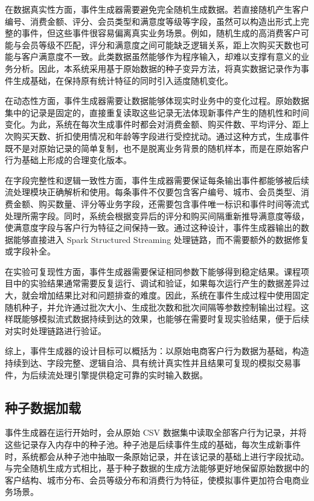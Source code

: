 \documentclass[12pt,hyperref,a4paper,UTF8]{ctexart}
\begin{document}
在数据真实性方面，事件生成器需要避免完全随机生成数据。若直接随机产生客户编号、消费金额、评分、会员类型和满意度等级等字段，虽然可以构造出形式上完整的事件，但这些事件很容易偏离真实业务场景。例如，随机生成的高消费客户可能与会员等级不匹配，评分和满意度之间可能缺乏逻辑关系，距上次购买天数也可能与客户满意度不一致。此类数据虽然能够作为程序输入，却难以支撑有意义的业务分析。因此，本系统采用基于原始数据的种子变异方法，将真实数据记录作为事件生成基础，在保持原有统计特征的同时引入适度随机变化。

在动态性方面，事件生成器需要让数据能够体现实时业务中的变化过程。原始数据集中的记录是固定的，直接重复读取这些记录无法体现新事件产生的随机性和时间变化。为此，系统在每次生成事件时都会对消费金额、购买件数、平均评分、距上次购买天数、折扣使用情况和年龄等字段进行受控扰动。通过这种方式，生成事件既不是对原始记录的简单复制，也不是脱离业务背景的随机样本，而是在原始客户行为基础上形成的合理变化版本。

在字段完整性和逻辑一致性方面，事件生成器需要保证每条输出事件都能够被后续流处理模块正确解析和使用。每条事件不仅要包含客户编号、城市、会员类型、消费金额、购买数量、评分等业务字段，还需要包含事件唯一标识和事件时间等流式处理所需字段。同时，系统会根据变异后的评分和购买间隔重新推导满意度等级，使满意度字段与客户行为特征之间保持一致。通过这种设计，事件生成器输出的数据能够直接进入 Spark Structured Streaming 处理链路，而不需要额外的数据修复或字段补全。

在实验可复现性方面，事件生成器需要保证相同参数下能够得到稳定结果。课程项目中的实验结果通常需要反复运行、调试和验证，如果每次运行产生的数据差异过大，就会增加结果比对和问题排查的难度。因此，系统在事件生成过程中使用固定随机种子，并允许通过批次大小、生成批次数和批次间隔等参数控制输出过程。这样既能够模拟流式数据持续到达的效果，也能够在需要时复现实验结果，便于后续对实时处理链路进行验证。

综上，事件生成器的设计目标可以概括为：以原始电商客户行为数据为基础，构造持续到达、字段完整、逻辑自洽、具有统计真实性并且结果可复现的模拟交易事件，为后续流处理引擎提供稳定可靠的实时输入数据。

\subsection{种子数据加载}

事件生成器在运行开始时，会从原始 CSV 数据集中读取全部客户行为记录，并将这些记录存入内存中的种子池。种子池是后续事件生成的基础，每次生成新事件时，系统都会从种子池中抽取一条原始记录，并在该记录的基础上进行字段扰动。与完全随机生成方式相比，基于种子数据的生成方法能够更好地保留原始数据中的客户结构、城市分布、会员等级分布和消费行为特征，使模拟事件更加符合电商业务场景。
\end{document}
